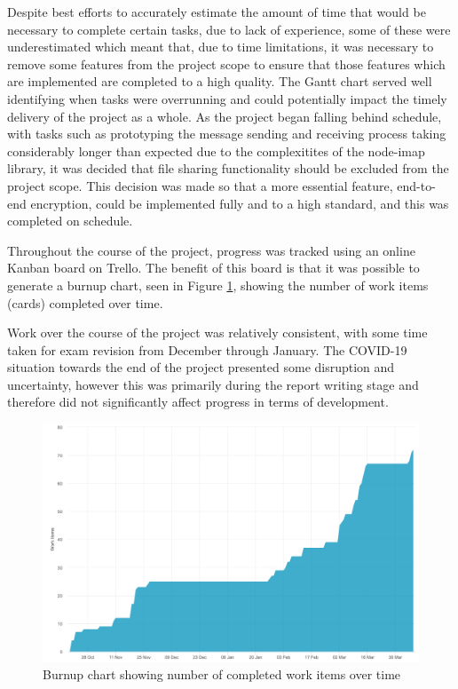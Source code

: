 Despite best efforts to accurately estimate the amount of time that would be necessary to complete certain tasks, due to lack of experience, some of these were underestimated which meant that, due to time limitations, it was necessary to remove some features from the project scope to ensure that those features which are implemented are completed to a high quality. The Gantt chart served well identifying when tasks were overrunning and could potentially impact the timely delivery of the project as a whole. As the project began falling behind schedule, with tasks such as prototyping the message sending and receiving process taking considerably longer than expected due to the complexitites of the node-imap library, it was decided that file sharing functionality should be excluded from the project scope. This decision was made so that a more essential feature, end-to-end encryption, could be implemented fully and to a high standard, and this was completed on schedule.

Throughout the course of the project, progress was tracked using an online Kanban board on Trello. The benefit of this board is that it was possible to generate a burnup chart, seen in Figure \ref{fig:burnup}, showing the number of work items (cards) completed over time.

Work over the course of the project was relatively consistent, with some time taken for exam revision from December through January. The COVID-19 situation towards the end of the project presented some disruption and uncertainty, however this was primarily during the report writing stage and therefore did not significantly affect progress in terms of development.

\begin{figure}[h!]
  \centering
  \includegraphics[width=\textwidth]{images/burnup.png}
  \caption{Burnup chart showing number of completed work items over time}
  \label{fig:burnup}
\end{figure}


